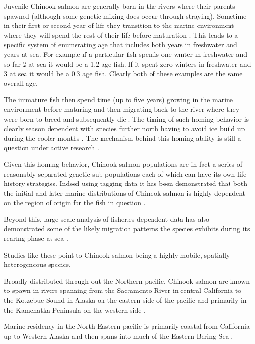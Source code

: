 \documentclass[11pt]{article}
\begin{document}
Juvenile Chinook salmon are generally born in the rivers where their parents spawned (although some genetic mixing does occur through straying). Sometime in their first or second year of life they transition to the marine environment where they will spend the rest of their life before maturation \citep{oceanchinook}. This leads to a specific system of enumerating age that includes both years in freshwater and years at sea. For example if a particular fish spends one winter in freshwater and so far 2 at sea it would be a 1.2 age fish. If it spent zero winters in freshwater and 3 at sea it would be a 0.3 age fish. Clearly both of these examples are the same overall age.

The immature fish then spend time (up to five years) growing in the marine environment before maturing and then migrating back to the river where they were born to breed and subsequently die \citep{oceanchinook}. The timing of such homing behavior is clearly season dependent with species further north having to avoid ice build up during the cooler months \citep{oceanchinook}. The mechanism behind this homing ability is still a question under active research \citep{bracis2012}. \newline

Given this homing behavior, Chinook salmon populations are in fact a series of reasonably separated genetic sub-populations each of which can have its own life history strategies. Indeed using tagging data it has been demonstrated that both the initial and later marine distributions of Chinook salmon is highly dependent on the region of origin for the fish in question \citep{shelton2019} \citep{tucker2019}. 

Beyond this, large scale analysis of fisheries dependent data has also demonstrated some of the likely migration patterns the species exhibits during its rearing phase at sea \citep{langan2024}. 

Studies like these point to Chinook salmon being a highly mobile, spatially heterogeneous species.\newline

Broadly distributed through out the Northern pacific, Chinook salmon are known to spawn in rivers spanning from the Sacramento River in central California to the Kotzebue Sound in Alaska on the eastern side of the pacific and primarily in the Kamchatka Peninsula on the western side \citep{oceanchinook}. 

Marine residency in the North Eastern pacific is primarily coastal from California up to Western Alaska and then spans into much of the Eastern Bering Sea \citep{oceanchinook} \citep{langan2024}. \newline
\end{document}

